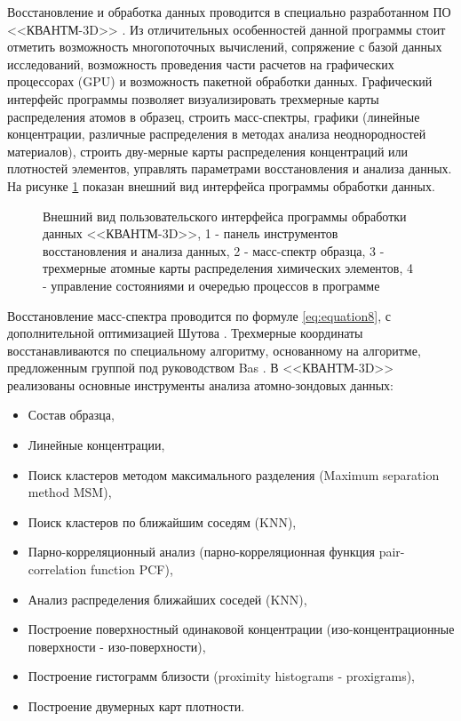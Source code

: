 Восстановление и обработка данных проводится в специально разработанном ПО <<КВАНТМ-3D>> \cite{KVANTM}. Из отличительных особенностей данной программы стоит отметить возможность многопоточных вычислений, сопряжение с базой данных исследований, возможность проведения части расчетов на графических процессорах (GPU) и возможность пакетной обработки данных. Графический интерфейс программы позволяет визуализировать трехмерные карты распределения атомов в образец, строить масс-спектры, графики (линейные концентрации, различные распределения в методах анализа неоднородностей материалов), строить дву-мерные карты распределения концентраций или плотностей элементов, управлять параметрами восстановления и анализа данных. На рисунке \cref{fig:APPLE_kvant} показан внешний вид интерфейса программы обработки данных.

\begin{figure}[htb]
	\caption{Внешний вид пользовательского интерфейса программы обработки данных <<КВАНТМ-3D>>, 1 - панель инструментов восстановления и анализа данных, 2 - масс-спектр образца, 3 - трехмерные атомные карты распределения химических элементов, 4 - управление состояниями и очередью процессов в программе}
	\label{fig:APPLE_kvant}
\end{figure}

Восстановление масс-спектра проводится по формуле \cref{eq:equation8}, с дополнительной оптимизацией Шутова \cite{Shutov19}. Трехмерные координаты восстанавливаются по специальному алгоритму, основанному на алгоритме, предложенным группой под руководством Bas \cite{Bas95}. В <<КВАНТМ-3D>> реализованы основные инструменты анализа атомно-зондовых данных:

\begin{itemize}
	\item Состав образца,
	\item Линейные концентрации,
	\item Поиск кластеров методом максимального разделения (Maximum separation method MSM),
	\item Поиск кластеров по ближайшим соседям (KNN),
	\item Парно-корреляционный анализ (парно-корреляционная функция pair-correlation function PCF),
	\item Анализ распределения ближайших соседей (KNN),
	\item Построение поверхностный одинаковой концентрации (изо-концентрационные поверхности - изо-поверхности),
	\item Построение гистограмм близости (proximity histograms - proxigrams),
	\item Построение двумерных карт плотности.
\end{itemize}

